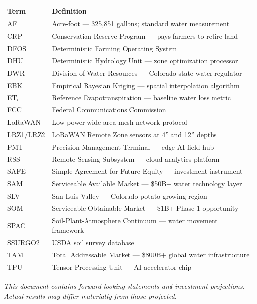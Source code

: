 \documentclass[10pt]{article}
\begin{document}
\begin{table}[h]
\centering
\small
\begin{tabular}{@{}lp{4.5in}@{}}
\toprule
\textbf{Term} & \textbf{Definition} \\
\midrule
AF & Acre-foot — 325,851 gallons; standard water measurement \\
CRP & Conservation Reserve Program — pays farmers to retire land \\
DFOS & Deterministic Farming Operating System \\
DHU & Deterministic Hydrology Unit — zone optimization processor \\
DWR & Division of Water Resources — Colorado state water regulator \\
EBK & Empirical Bayesian Kriging — spatial interpolation algorithm \\
ET₀ & Reference Evapotranspiration — baseline water loss metric \\
FCC & Federal Communications Commission \\
LoRaWAN & Low-power wide-area mesh network protocol \\
LRZ1/LRZ2 & LoRaWAN Remote Zone sensors at 4'' and 12'' depths \\
PMT & Precision Management Terminal — edge AI field hub \\
RSS & Remote Sensing Subsystem — cloud analytics platform \\
SAFE & Simple Agreement for Future Equity — investment instrument \\
SAM & Serviceable Available Market — \$50B+ water technology layer \\
SLV & San Luis Valley — Colorado potato-growing region \\
SOM & Serviceable Obtainable Market — \$1B+ Phase 1 opportunity \\
SPAC & Soil-Plant-Atmosphere Continuum — water movement framework \\
SSURGO2 & USDA soil survey database \\
TAM & Total Addressable Market — \$800B+ global water infrastructure \\
TPU & Tensor Processing Unit — AI accelerator chip \\
\bottomrule
\end{tabular}
\end{table}

\vfill

\begin{center}
\small\color{farmsense-gray}
\textit{This document contains forward-looking statements and investment projections.}\\
\textit{Actual results may differ materially from those projected.}
\end{center}
\end{document}
